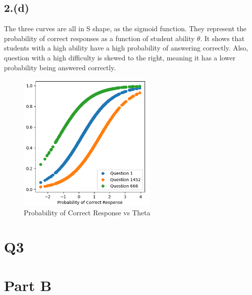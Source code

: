 \documentclass{article}
\begin{document}
\subsection*{2.(d)}
The three curves are all in S shape, as the sigmoid function. They represent the probability of correct responses as a function of student ability $\theta$.\newline
It shows that students with a high ability have a high probability of answering correctly.\newline
Also, question with a high difficulty is skewed to the right, meaning it has a lower probability being answered correctly.
\begin{figure}[H]
    \centering
    \includegraphics[width=0.6\textwidth]{2(d).png}
    \caption{Probability of Correct Response vs Theta}
\end{figure}


\newpage
\section*{Q3}


\newpage
\section*{Part B}
\end{document}
